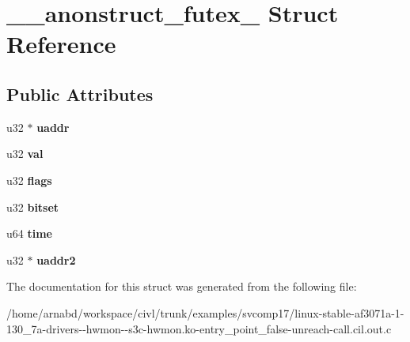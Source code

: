 \hypertarget{struct____anonstruct__futex__9}{}\section{\+\_\+\+\_\+anonstruct\+\_\+futex\+\_ Struct Reference}
\label{struct____anonstruct__futex__9}
\subsection*{Public Attributes}
\begin{DoxyCompactItemize}
\item 
\hypertarget{struct____anonstruct__futex__9_a589acea9e86453c8de7d3948f1621907}{}u32 $\ast$ {\bfseries uaddr}\label{struct____anonstruct__futex__9_a589acea9e86453c8de7d3948f1621907}

\item 
\hypertarget{struct____anonstruct__futex__9_a5f0c806f8fd2c8946db2d4c719ff5dd9}{}u32 {\bfseries val}\label{struct____anonstruct__futex__9_a5f0c806f8fd2c8946db2d4c719ff5dd9}

\item 
\hypertarget{struct____anonstruct__futex__9_ac3e3316eb7f406694a142c7544468e14}{}u32 {\bfseries flags}\label{struct____anonstruct__futex__9_ac3e3316eb7f406694a142c7544468e14}

\item 
\hypertarget{struct____anonstruct__futex__9_a4f86c483838ba05ba5045e9e759ad51d}{}u32 {\bfseries bitset}\label{struct____anonstruct__futex__9_a4f86c483838ba05ba5045e9e759ad51d}

\item 
\hypertarget{struct____anonstruct__futex__9_af121dab58a60930c088fa880f492857c}{}u64 {\bfseries time}\label{struct____anonstruct__futex__9_af121dab58a60930c088fa880f492857c}

\item 
\hypertarget{struct____anonstruct__futex__9_aaa03732e6e095386f791ec9f9852d8b8}{}u32 $\ast$ {\bfseries uaddr2}\label{struct____anonstruct__futex__9_aaa03732e6e095386f791ec9f9852d8b8}

\end{DoxyCompactItemize}


The documentation for this struct was generated from the following file\+:\begin{DoxyCompactItemize}
\item 
/home/arnabd/workspace/civl/trunk/examples/svcomp17/linux-\/stable-\/af3071a-\/1-\/130\+\_\+7a-\/drivers-\/-\/hwmon-\/-\/s3c-\/hwmon.\+ko-\/entry\+\_\+point\+\_\+false-\/unreach-\/call.\+cil.\+out.\+c\end{DoxyCompactItemize}
